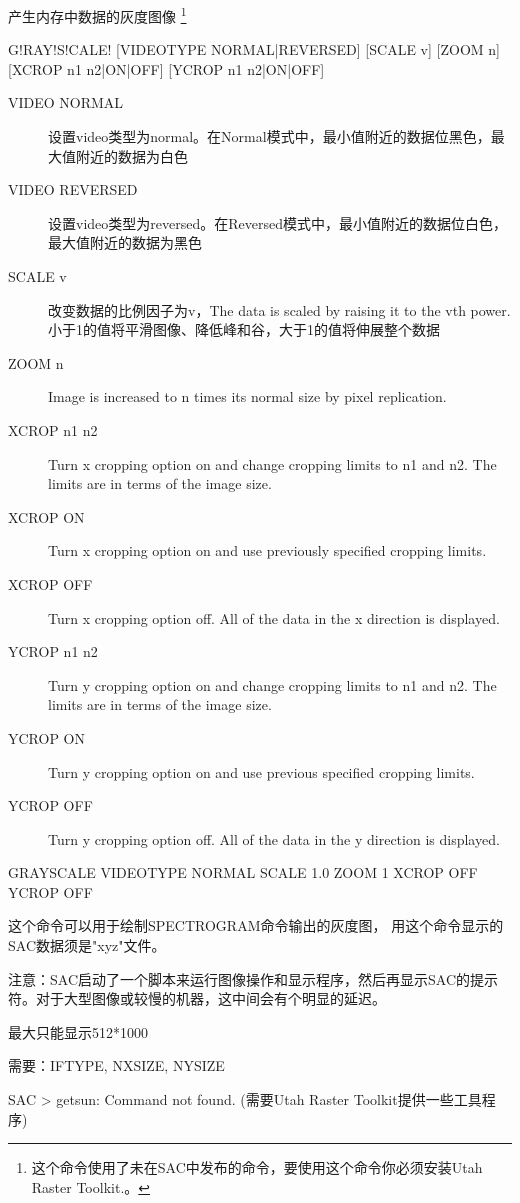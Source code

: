 \label{cmd:grayscale}

产生内存中数据的灰度图像
\footnote{
这个命令使用了未在SAC中发布的命令，要使用这个命令你必须安装Utah Raster Toolkit.。
}

\begin{SACSTX}
G!RAY!S!CALE! [VIDEOTYPE NORMAL|REVERSED] [SCALE v] [ZOOM n]
    [XCROP n1 n2|ON|OFF] [YCROP n1 n2|ON|OFF]
\end{SACSTX}

\begin{description}
\item [VIDEO NORMAL] 设置video类型为normal。在Normal模式中，最小值附近的数据位黑色，最大值附近的数据为白色
\item [VIDEO REVERSED] 设置video类型为reversed。在Reversed模式中，最小值附近的数据位白色，最大值附近的数据为黑色
\item [SCALE v] 改变数据的比例因子为v，The data is scaled by raising it to the vth power.小于1的值将平滑图像、降低峰和谷，大于1的值将伸展整个数据
\item [ZOOM n] Image is increased to n times its normal size by pixel replication.
\item [XCROP n1 n2] Turn x cropping option on and change cropping limits to n1 and n2. The limits are in terms of the image size.
\item [XCROP ON] Turn x cropping option on and use previously specified cropping limits.
\item [XCROP OFF] Turn x cropping option off.  All of the data in the x direction is displayed.
\item [YCROP n1 n2] Turn y cropping option on and change cropping limits to n1 and n2. The limits are in terms of the image size.
\item [YCROP ON] Turn y cropping option on and use previous specified cropping limits.
\item [YCROP OFF] Turn y cropping option off.  All of the data in the y direction is displayed.
\end{description}

\begin{SACDFT}
GRAYSCALE VIDEOTYPE NORMAL SCALE 1.0 ZOOM 1 XCROP OFF YCROP OFF
\end{SACDFT}

这个命令可以用于绘制SPECTROGRAM命令输出的灰度图， 用这个命令显示的SAC数据须是"xyz"文件。

注意：SAC启动了一个脚本来运行图像操作和显示程序，然后再显示SAC的提示符。对于大型图像或较慢的机器，这中间会有个明显的延迟。

最大只能显示512*1000

需要：IFTYPE, NXSIZE, NYSIZE

SAC > getsun: Command not found.  (需要Utah Raster Toolkit提供一些工具程序)

